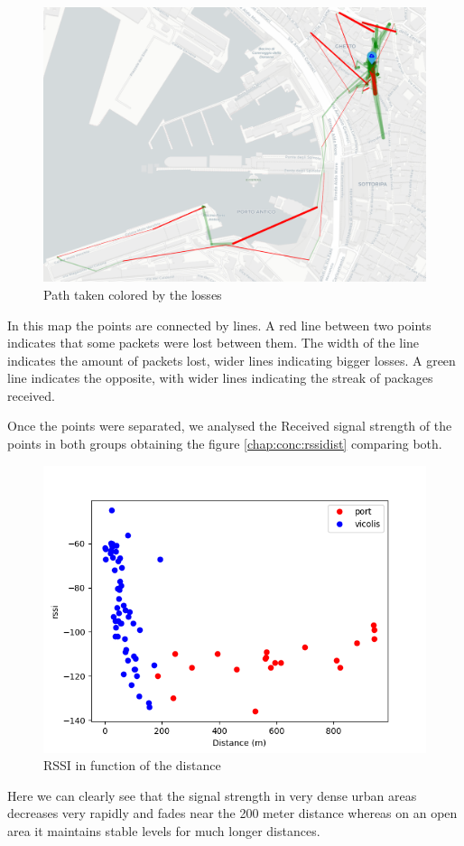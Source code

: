 \begin{figure}[htpb]
\centering    
\includegraphics[width=\linewidth]{coloredPath.png}
\caption{Path taken colored by the losses}
\label{chap:conc-colpath}
\end{figure}
In this map the points are connected by lines. A red line between two points indicates that some packets were lost between them. The width of the line indicates the amount of packets lost,  wider lines indicating  bigger losses. 
A green line indicates the opposite, with wider lines indicating the streak of packages received.

Once the points were separated, we analysed the Received signal strength of the points in both 
groups obtaining the figure \vref{chap:conc:rssidist}  comparing both.

\begin{figure}[htpb]
\centering    
\includegraphics[width=\linewidth]{rssidistancia.png}
\caption{RSSI in function of the distance}
\label{chap:conc:rssidist}
\end{figure}
Here we can clearly see that the signal strength in very dense urban areas decreases very rapidly and fades near the 200 meter distance whereas 
on an open area it maintains stable levels for much longer distances.


